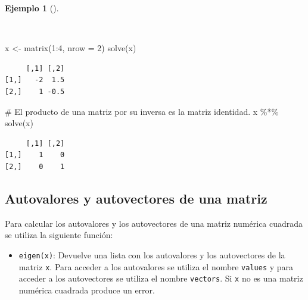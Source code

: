 \documentclass[
  a4paper,
]{scrreport}
\newenvironment{Shaded}{\begin{snugshade}}{\end{snugshade}}
\newcommand{\AttributeTok}[1]{\textcolor[rgb]{0.40,0.45,0.13}{#1}}
\newcommand{\CommentTok}[1]{\textcolor[rgb]{0.37,0.37,0.37}{#1}}
\newcommand{\DecValTok}[1]{\textcolor[rgb]{0.68,0.00,0.00}{#1}}
\newcommand{\FunctionTok}[1]{\textcolor[rgb]{0.28,0.35,0.67}{#1}}
\newcommand{\NormalTok}[1]{\textcolor[rgb]{0.00,0.23,0.31}{#1}}
\newcommand{\OtherTok}[1]{\textcolor[rgb]{0.00,0.23,0.31}{#1}}
\newcommand{\SpecialCharTok}[1]{\textcolor[rgb]{0.37,0.37,0.37}{#1}}
\providecommand{\tightlist}{%
  \setlength{\itemsep}{0pt}\setlength{\parskip}{0pt}}\usepackage{longtable,booktabs,array}
\theoremstyle{definition}
\theoremstyle{definition}
\newtheorem{example}{Ejemplo}[chapter]
\theoremstyle{remark}
\begin{document}
\begin{example}[]\protect\hypertarget{exm-inversa-matriz}{}\label{exm-inversa-matriz}

~

\begin{Shaded}
\begin{Highlighting}[]
\NormalTok{x }\OtherTok{\textless{}{-}} \FunctionTok{matrix}\NormalTok{(}\DecValTok{1}\SpecialCharTok{:}\DecValTok{4}\NormalTok{, }\AttributeTok{nrow =} \DecValTok{2}\NormalTok{)}
\FunctionTok{solve}\NormalTok{(x)}
\end{Highlighting}
\end{Shaded}

\begin{verbatim}
     [,1] [,2]
[1,]   -2  1.5
[2,]    1 -0.5
\end{verbatim}

\begin{Shaded}
\begin{Highlighting}[]
\CommentTok{\# El producto de una matriz por su inversa es la matriz identidad.}
\NormalTok{x }\SpecialCharTok{\%*\%} \FunctionTok{solve}\NormalTok{(x)}
\end{Highlighting}
\end{Shaded}

\begin{verbatim}
     [,1] [,2]
[1,]    1    0
[2,]    0    1
\end{verbatim}

\end{example}

\hypertarget{autovalores-y-autovectores-de-una-matriz}{%
\subsection{Autovalores y autovectores de una
matriz}\label{autovalores-y-autovectores-de-una-matriz}}

Para calcular los autovalores y los autovectores de una matriz numérica
cuadrada se utiliza la siguiente función:

\begin{itemize}
\tightlist
\item
  \texttt{eigen(x)}: Devuelve una lista con los autovalores y los
  autovectores de la matriz \texttt{x}. Para acceder a los autovalores
  se utiliza el nombre \texttt{values} y para acceder a los autovectores
  se utiliza el nombre \texttt{vectors}. Si \texttt{x} no es una matriz
  numérica cuadrada produce un error.
\end{itemize}
\end{document}
